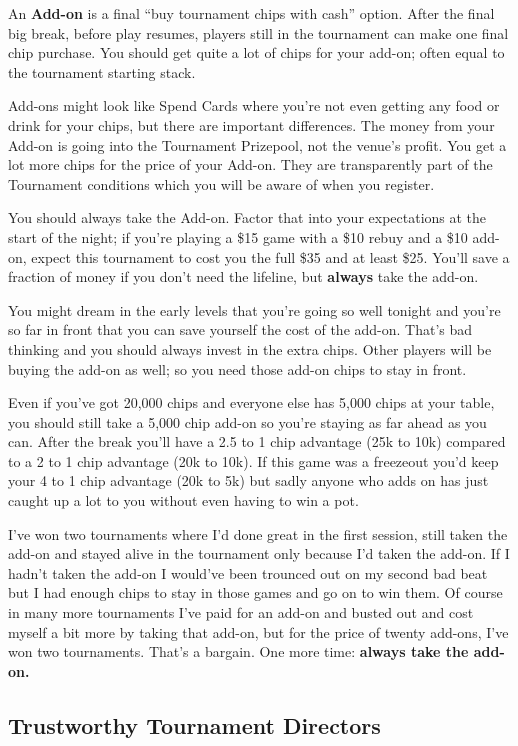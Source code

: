 An \textbf{Add-on} is a final ``buy tournament chips with cash''
option. After the final big break, before play resumes, players still
in the tournament can make one final chip purchase. You should get
quite a lot of chips for your add-on; often equal to the tournament
starting stack.

Add-ons might look like Spend Cards where you're not even
getting any food or drink for your chips, but there are important
differences. The money from your Add-on is going into the Tournament
Prizepool, not the venue's profit. You get a lot more chips for
the price of your Add-on. They are transparently part of the
Tournament conditions which you will be aware of when you register.

You should always take the Add-on. Factor that into your expectations
at the start of the night; if you're playing a \$15 game with a \$10
rebuy and a \$10 add-on, expect this tournament to cost you the full
\$35 and at least \$25. You'll save a fraction of money if you don't
need the lifeline, but \textbf{always} take the add-on.

You might dream in the early levels that you're going so well
tonight and you're so far in front that you can save yourself
the cost of the add-on. That's bad thinking and you should always
invest in the extra chips. Other players will be buying the add-on
as well; so you need those add-on chips to stay in front.

Even if you've got 20,000 chips and everyone else has 5,000 chips at
your table, you should still take a 5,000 chip add-on so you're staying
as far ahead as you can. After the break you'll have a 2.5 to 1 chip
advantage (25k to 10k) compared to a 2 to 1 chip advantage (20k to 10k).
If this game was a freezeout you'd keep your 4 to 1 chip advantage
(20k to 5k) but sadly anyone who adds on has just caught up a lot to you
without even having to win a pot.

I've won two tournaments where I'd done great in the first session,
still taken the add-on and stayed alive in the tournament only because
I'd taken the add-on. If I hadn't taken the add-on I would've been
trounced out on my second bad beat but I had enough chips to stay in
those games and go on to win them. Of course in many more tournaments
I've paid for an add-on and busted out and cost myself a bit more by
taking that add-on, but for the price of twenty add-ons, I've won two
tournaments. That's a bargain. One more
time: \textbf{always take the add-on.}

\subsection{Trustworthy Tournament Directors}

